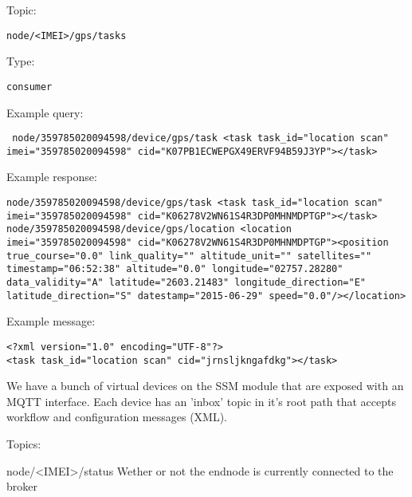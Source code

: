Topic:
\begin{lstlisting}node/<IMEI>/gps/tasks\end{lstlisting}
Type:
\begin{lstlisting}consumer\end{lstlisting}
Example query:
\begin{lstlisting} node/359785020094598/device/gps/task <task task_id="location scan" imei="359785020094598" cid="K07PB1ECWEPGX49ERVF94B59J3YP"></task>\end{lstlisting}
Example response:
\begin{lstlisting}node/359785020094598/device/gps/task <task task_id="location scan" imei="359785020094598" cid="K06278V2WN61S4R3DP0MHNMDPTGP"></task>
node/359785020094598/device/gps/location <location imei="359785020094598" cid="K06278V2WN61S4R3DP0MHNMDPTGP"><position true_course="0.0" link_quality="" altitude_unit="" satellites="" timestamp="06:52:38" altitude="0.0" longitude="02757.28280" data_validity="A" latitude="2603.21483" longitude_direction="E" latitude_direction="S" datestamp="2015-06-29" speed="0.0"/></location>\end{lstlisting}
Example message:
\begin{lstlisting}
<?xml version="1.0" encoding="UTF-8"?>
<task task_id="location scan" cid="jrnsljkngafdkg"></task>
\end{lstlisting}






We have a bunch of virtual devices on the SSM module that are exposed with an
MQTT interface. Each device has an 'inbox' topic in it's root path that accepts
workflow and configuration messages (XML).

Topics:

node/<IMEI>/status
Wether or not the endnode is currently connected to the broker




    
    
    
    
    
    
    
    
    
    
    
    
    
    
    
    
    
    
    
    
    
    
    
    
    
    
    
    
    
    
  
  
  
  
  
  
  
  
  
  
  
  
  
  
  
  
  
  
  
  
  
  
  